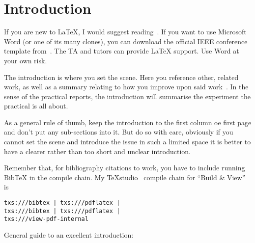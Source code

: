 \section{Introduction}

If you are new to \LaTeX{}, I would suggest reading~\cite{Oetiker_2015}.  If you want to use Microsoft Word (or one of its many clones), you can download the official IEEE conference template from~\cite{Word_Template}.  The TA and tutors can provide \LaTeX{} support.  Use Word at your own risk.

The introduction is where you set the scene.  Here you reference other, related work, as well as a summary relating to how you improve upon said work~\cite{BibExample}.  In the sense of the practical reports, the introduction will summarise the experiment the practical is all about.

As a general rule of thumb, keep the introduction to the first column oe first page and don't put any \mbox{sub-sections} into it. But do so with care, obviously if you cannot set the scene and introduce the issue in such a limited space it is better to have a clearer rather than too short and unclear introduction.

Remember that, for bibliography citations to work, you have to include running Bib\TeX{} in the compile chain.  My TeXstudio~\cite{TeXstudio} compile chain for ``Build \& View'' is\linebreak
\vspace{-6mm}
\begin{verbatim}
txs:///bibtex | txs:///pdflatex |
txs:///bibtex | txs:///pdflatex |
txs:///view-pdf-internal
\end{verbatim}

General guide to an excellent introduction:

